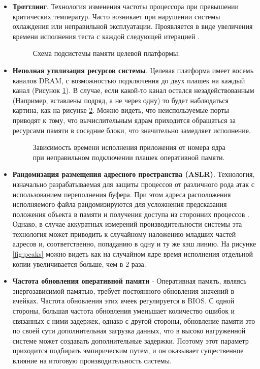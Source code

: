 \begin{itemize}
	\item  \textbf{Троттлинг}. Технология изменения частоты процессора при превышении критических температур. Часто возникает при нарушении системы охлаждения или неправильной эксплуатации. Проявляется в виде увеличения времени исполнения теста с каждой следующей итерацией \cite{zhang2009hardware}.
		\begin{figure}[ht]
		\caption{Схема подсистемы памяти целевой платформы.}\label{fig:ddrsvg1}
	\end{figure}
	\item  \textbf{Неполная утилизация ресурсов системы}. Целевая платформа имеет восемь каналов DRAM, с возможностью подключения до двух плашек на каждый канал (Рисунок \ref{fig:ddrsvg1}). В случае, если какой-то канал остался незадействованным (Например, вставлены подряд, а не через одну) то будет наблюдаться картина, как на рисунке \ref{fig:lack_of_memmory}. Можно видеть, что неиспользуемые порты приводят к тому, что вычислительным ядрам приходится обращаться за ресурсами памяти в соседние блоки, что значительно замедляет исполнение.

	
	\begin{figure}[ht]
		\caption{Зависимость времени исполнения приложения от номера ядра при неправильном подключении плашек оперативной памяти.}\label{fig:lack_of_memmory}
	\end{figure}
	\item \textbf{Рандомизация размещения адресного пространства (ASLR)}. Технология, изначально разрабатываемая для защиты процессов от различного рода атак с использованием  переполнения буфера. При этом  адреса расположения исполняемого файла рандомизируются для усложнения предсказания положения объекта в памяти и получения доступа из сторонних процессов \cite{gras2017aslr}. Однако, в случае аккуратных измерений производительности системы эта технология может приводить к случайному наложению младших частей адресов и, соответственно, попаданию в одну и ту же кэш линию. На рисунке \ref{fig:peaks}  можно видеть как на случайном ядре время исполнения отдельной копии увеличивается больше, чем в 2 раза.
	\item \textbf{Частота обновления оперативной памяти} - Оперативная память, являясь энергозависимой памятью, требует постоянного обновления значений в ячейках. Частота обновления этих ячеек регулируется в BIOS. С одной стороны, большая частота обновления уменьшает количество ошибок и связанных с ними задержек, однако с другой стороны, обновление памяти это по своей сути дополнительная загрузка данных, что в высоко нагруженной системе может создавать дополнительные задержки. Поэтому этот параметр приходится подбирать эмпирическим путем, и он оказывает существенное влияние на итоговую производительность системы.
	

\end{itemize}
